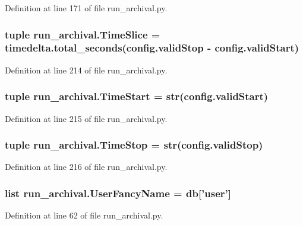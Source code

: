 Definition at line 171 of file run\-\_\-archival.\-py.

\hypertarget{namespacerun__archival_ad807127baa562a1a1f13c1c41dc9ff7c}{
\subsubsection[{Time\-Slice}]{\setlength{\rightskip}{0pt plus 5cm}tuple run\-\_\-archival.\-Time\-Slice = timedelta.\-total\-\_\-seconds(config.\-valid\-Stop -\/ config.\-valid\-Start)}}\label{namespacerun__archival_ad807127baa562a1a1f13c1c41dc9ff7c}


Definition at line 214 of file run\-\_\-archival.\-py.

\hypertarget{namespacerun__archival_a53d4e2d27208c61f6d716aabecf14cb9}{
\subsubsection[{Time\-Start}]{\setlength{\rightskip}{0pt plus 5cm}tuple run\-\_\-archival.\-Time\-Start = str(config.\-valid\-Start)}}\label{namespacerun__archival_a53d4e2d27208c61f6d716aabecf14cb9}


Definition at line 215 of file run\-\_\-archival.\-py.

\hypertarget{namespacerun__archival_adac2aadd91ae98a0f37065bf28c01999}{
\subsubsection[{Time\-Stop}]{\setlength{\rightskip}{0pt plus 5cm}tuple run\-\_\-archival.\-Time\-Stop = str(config.\-valid\-Stop)}}\label{namespacerun__archival_adac2aadd91ae98a0f37065bf28c01999}


Definition at line 216 of file run\-\_\-archival.\-py.

\hypertarget{namespacerun__archival_ad3d0610b847435ac05cfa998baad6da1}{
\subsubsection[{User\-Fancy\-Name}]{\setlength{\rightskip}{0pt plus 5cm}list run\-\_\-archival.\-User\-Fancy\-Name = {\bf db}\mbox{[}'user'\mbox{]}}}\label{namespacerun__archival_ad3d0610b847435ac05cfa998baad6da1}


Definition at line 62 of file run\-\_\-archival.\-py.

